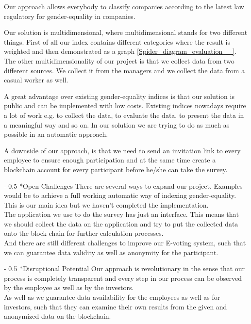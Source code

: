 \documentclass[portrait,a4paper]{article}
\makeatletter
\renewcommand\paragraph{\@startsection{paragraph}{4}{0mm}%
	{-\baselineskip}%
	{0.5\baselineskip}%
	{\normalfont\bfseries}%
}%
\makeatother
\begin{document}
		Our approach allows everybody to classify companies according to the latest law regulatory for gender-equality in companies.
		
		Our solution is multidimensional, where multidimensional stands for two different things. 
		First of all our index contains different categories where the result is weighted and then demonstrated 
		as a graph \ref{Spider_diagram_evaluation__}.
		The other multidimensionality of our project is that we collect data from two different sources. 
		We collect it from the managers and we collect the data from a casual worker as well.
		
		A great advantage over existing gender-equality indices is that our solution is public and can be implemented
		with low costs. Existing indices nowadays require a lot of work e.g. to collect the data, to evaluate the data, 
		to present the data in a meaningful way and so on. In our solution we are trying to do as much as possible in an automatic approach.
		
		A downside of our approach, is that we need to send an invitation link to every employee to ensure enough participation and
		at the same time create a blockchain account for every participant before he/she can take the survey.

	\paragraph*{Open Challenges}
		There are several ways to expand our project. Examples would be to achieve a full working automatic way of 
		indexing gender-equality. This is our main idea but we haven't completed the implementation.\\
		The application we use to do the survey has just an interface. This means that we should collect the data on 
		the application and try to put the collected data onto the block-chain for further calculation processes.\\
		And there are still different challenges to improve our E-voting system, such that we can guarantee data validity
		as well as anonymity for the participant.
	
	\paragraph*{Disruptional Potential}
		Our approach is revolutionary in the sense that our process is completely transparent and every step in our process
		can be observed by the employee as well as by the investors.\\
		As well as we guarantee data availability for the employees as well as for investors, such that they can
		examine their own results from the given and anonymized data on the blockchain.\\
		
\end{document}
